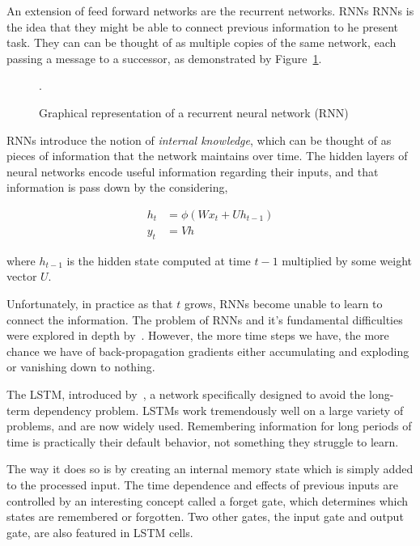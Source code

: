 An extension of feed forward networks are the recurrent networks. RNNs RNNs is
the idea that they might be able to connect previous information to he present
task. They can can be thought of as multiple copies of the same network, each
passing a message to a successor, as demonstrated by Figure~\ref{fig:rnn}.

\begin{figure}[!htbp]
    \centering
    
    \caption{Graphical representation of a recurrent neural network (RNN)}.\label{fig:rnn}
\end{figure}

RNNs introduce the notion of \textit{internal knowledge}, which can be thought of
as pieces of information that the network maintains over time. The hidden layers
of neural networks encode useful information regarding their inputs, and that
information is pass down by the considering,

\begin{align}\label{eq:recurrent_neural_network_equations}
    h_t & = \phi(Wx_t + Uh_{t-1}) \\
    y_t & = Vh
\end{align}

where \(h_{t-1}\) is the hidden state computed at time \(t-1\) multiplied by
some weight vector \(U\).

Unfortunately, in practice as that \(t\) grows, RNNs become unable to learn to
connect the information. The problem of RNNs and it's fundamental difficulties
were explored in depth by~\cite{Bengio1994}. However, the more time steps we
have, the more chance we have of back-propagation gradients either accumulating
and exploding or vanishing down to nothing.

The LSTM, introduced by~\cite{Hochreiter1997}, a network specifically designed
to avoid the long-term dependency problem. LSTMs work tremendously well on a
large variety of problems, and are now widely used. Remembering information for
long periods of time is practically their default behavior, not something they
struggle to learn.

The way it does so is by creating an internal memory state which is simply added
to the processed input. The time dependence and effects of previous inputs are
controlled by an interesting concept called a forget gate, which determines
which states are remembered or forgotten. Two other gates, the input gate and
output gate, are also featured in LSTM cells.

